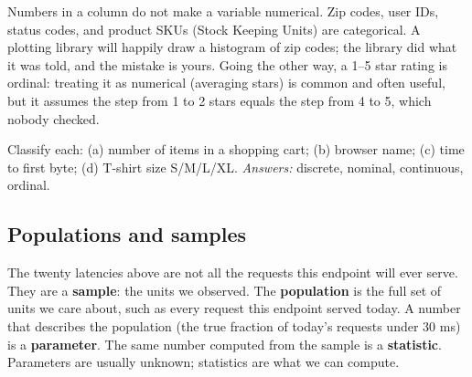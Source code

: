 \begin{trapbox}
Numbers in a column do not make a variable numerical. Zip codes, user IDs, status codes, and
product SKUs (Stock Keeping Units) are categorical. A plotting library will happily draw a histogram of zip codes;
the library did what it was told, and the mistake is yours. Going the other way, a 1--5 star rating is ordinal: treating
it as numerical (averaging stars) is common and often useful, but it assumes the step from 1 to
2 stars equals the step from 4 to 5, which nobody checked.
\end{trapbox}

\begin{recoverybox}
Classify each: (a) number of items in a shopping cart; (b) browser name; (c) time to first
byte; (d) T-shirt size S/M/L/XL. \emph{Answers:} discrete, nominal, continuous, ordinal.
\end{recoverybox}

\subsection{Populations and samples}

The twenty latencies above are not all the requests this endpoint will ever serve. They are
a \textbf{sample}: the units we observed. The \textbf{population} is the full set of
units we care about, such as every request this endpoint served today. A number that describes
the population (the true fraction of today's requests under 30 ms) is a \textbf{parameter}. The
same number computed from the sample is a \textbf{statistic}. Parameters are usually unknown;
statistics are what we can compute.

